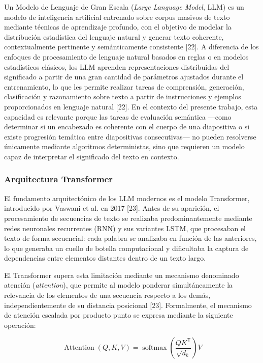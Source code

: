 \documentclass[11pt]{article}
\newif\ifshowttiimarks
\newcommand{\ttiiTOC}[1]{%
  \ifshowttiimarks
    \texorpdfstring{\textcolor{ttiipurple}{\textbf{#1}}}{#1}%
  \else
    #1%
  \fi
}
\begin{document}
Un Modelo de Lenguaje de Gran Escala (\textit{Large Language Model}, LLM) es un modelo de inteligencia artificial entrenado sobre corpus masivos de texto mediante técnicas de aprendizaje profundo, con el objetivo de modelar la distribución estadística del lenguaje natural y generar texto coherente, contextualmente pertinente y semánticamente consistente [22]. A diferencia de los enfoques de procesamiento de lenguaje natural basados en reglas o en modelos estadísticos clásicos, los LLM aprenden representaciones distribuidas del significado a partir de una gran cantidad de parámetros ajustados durante el entrenamiento, lo que les permite realizar tareas de comprensión, generación, clasificación y razonamiento sobre texto a partir de instrucciones y ejemplos proporcionados en lenguaje natural [22]. En el contexto del presente trabajo, esta capacidad es relevante porque las tareas de evaluación semántica —como determinar si un encabezado es coherente con el cuerpo de una diapositiva o si existe progresión temática entre diapositivas consecutivas— no pueden resolverse únicamente mediante algoritmos deterministas, sino que requieren un modelo capaz de interpretar el significado del texto en contexto.

\subsubsection*{Arquitectura Transformer}
\addcontentsline{toc}{subsubsection}{\protect\ttiiTOC{Arquitectura Transformer}}

El fundamento arquitectónico de los LLM modernos es el modelo Transformer, introducido por Vaswani et al. en 2017 [23]. Antes de su aparición, el procesamiento de secuencias de texto se realizaba predominantemente mediante redes neuronales recurrentes (RNN) y sus variantes LSTM, que procesaban el texto de forma secuencial: cada palabra se analizaba en función de las anteriores, lo que generaba un cuello de botella computacional y dificultaba la captura de dependencias entre elementos distantes dentro de un texto largo.

El Transformer supera esta limitación mediante un mecanismo denominado atención (\textit{attention}), que permite al modelo ponderar simultáneamente la relevancia de los elementos de una secuencia respecto a los demás, independientemente de su distancia posicional [23]. Formalmente, el mecanismo de atención escalada por producto punto se expresa mediante la siguiente operación:

\[
\operatorname{Attention}(Q,K,V)
=
\operatorname{softmax}\left(\frac{QK^{\mathsf{T}}}{\sqrt{d_k}}\right)V
\]
\end{document}
